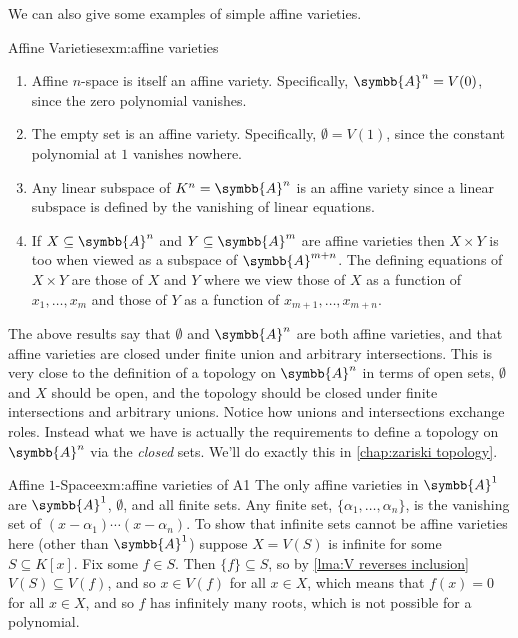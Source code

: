 \documentclass[fleqn]{NotesClass}
\newcommand{\affine}{\symbb{A}}
\begin{document}
    We can also give some examples of simple affine varieties.
    
    \begin{exm}{Affine Varieties}{exm:affine varieties}
        \begin{enumerate}
            \item Affine \(n\)-space is itself an affine variety.
            Specifically, \(\affine^n = V(0)\), since the zero polynomial vanishes.
            \item The empty set is an affine variety.
            Specifically, \(\emptyset = V(1)\), since the constant polynomial at \(1\) vanishes nowhere.
            \item Any linear subspace of \(K^n = \affine^n\) is an affine variety since a linear subspace is defined by the vanishing of linear equations.
            \item If \(X \subseteq \affine^n\) and \(Y \subseteq \affine^m\) are affine varieties then \(X \times Y\) is too when viewed as a subspace of \(\affine^{m + n}\).
            The defining equations of \(X \times Y\) are those of \(X\) and \(Y\) where we view those of \(X\) as a function of \(x_1, \dotsc, x_m\) and those of \(Y\) as a function of \(x_{m + 1}, \dotsc, x_{m + n}\).
        \end{enumerate}
    \end{exm}
    
    \begin{remark}{}{}
        The above results say that \(\emptyset\) and \(\affine^n\) are both affine varieties, and that affine varieties are closed under finite union and arbitrary intersections.
        This is very close to the definition of a topology on \(\affine^n\) in terms of open sets, \(\emptyset\) and \(X\) should be open, and the topology should be closed under finite intersections and arbitrary unions.
        Notice how unions and intersections exchange roles.
        Instead what we have is actually the requirements to define a topology on \(\affine^n\) via the \emph{closed} sets.
        We'll do exactly this in \cref{chap:zariski topology}.
    \end{remark}
    
    \begin{exm}{Affine {\normalsize \(1\)}-Space}{exm:affine varieties of A1}
        The only affine varieties in \(\affine^1\) are \(\affine^1\), \(\emptyset\), and all finite sets.
        Any finite set, \(\{\alpha_1, \dotsc, \alpha_n\}\), is the vanishing set of \((x - \alpha_1) \dotsm (x - \alpha_n)\).
        To show that infinite sets cannot be affine varieties here (other than \(\affine^1\)) suppose \(X = V(S)\) is infinite for some \(S \subseteq K[x]\).
        Fix some \(f \in S\).
        Then \(\{f\} \subseteq S\), so by \cref{lma:V reverses inclusion} \(V(S) \subseteq V(f)\), and so \(x \in V(f)\) for all \(x \in X\), which means that \(f(x) = 0\) for all \(x \in X\), and so \(f\) has infinitely many roots, which is not possible for a polynomial.
    \end{exm}
    
\end{document}

